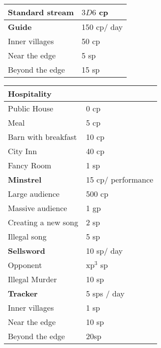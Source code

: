 \begin{multicols}{2}
\begin{tabularx}{\linewidth}{XX}
Standard stream & $3D6$ \gls{cp} \\\hline

\textbf{Guide} &  150 \gls{cp}/ day \\\hline

  Inner villages & 50 \gls{cp} \\
  Near the \gls{edge} & 5 \gls{sp} \\
  Beyond the \gls{edge} & 15 \gls{sp} \\

\end{tabularx}

\begin{tabularx}{\linewidth}{XX}
\hline
\textbf{Hospitality} &  \\\hline

Public House & 0 \gls{cp} \\

Meal & 5 \gls{cp} \\

Barn with breakfast & 10 \gls{cp} \\

City Inn & 40 \gls{cp} \\

Fancy Room & 1 \gls{sp} \\\hline

\textbf{Minstrel} &  15 \gls{cp}/ performance \\\hline

Large audience & 500 \gls{cp} \\

Massive audience & 1 \gls{gp} \\

Creating a new song & 2 \gls{sp} \\

Illegal song & 5 \gls{sp} \\\hline

\textbf{Sellsword} & 10 \gls{sp}/ day \\\hline

Opponent & \gls{xp}$^3$ \gls{sp} \\

Illegal Murder & 10 \gls{sp} \\\hline

\textbf{Tracker} &  5 \glspl{sp} / day \\\hline

  Inner villages & 1 \gls{sp} \\
  Near the \gls{edge} & 10 \gls{sp} \\
  Beyond the \gls{edge} & 20\gls{sp} \\
\hline

\end{tabularx}

\end{multicols}

